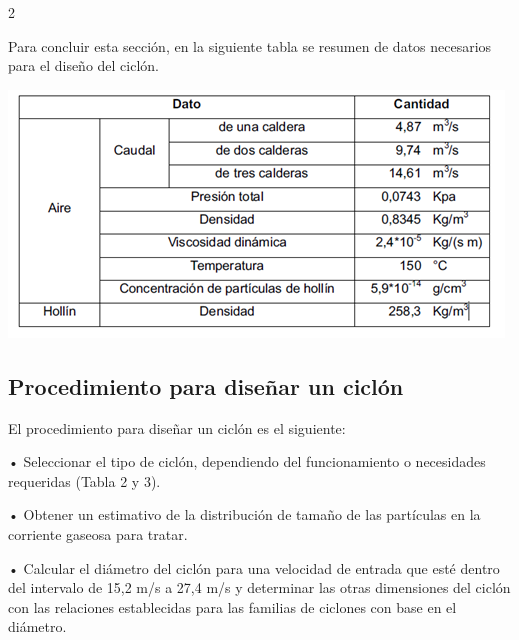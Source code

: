 \documentclass[12pt,spanish,Letterpaper,openany]{book}
\begin{document}
\begin {multicols}{2}
\begin {flushleft}
\begin{minipage}[c]{\columnwidth}
\end{minipage}

\end {flushleft}

Para concluir esta sección, en la siguiente tabla se resumen de datos necesarios para el diseño del ciclón.

\begin {flushleft}
\noindent\begin{minipage}[c]{\columnwidth}

\centering

\includegraphics[width=1\linewidth]{images/image09_wvaliente}

\end{minipage}

\end {flushleft}

\hypertarget{procedimiento-para-disenar-un-ciclon}{%
\subsection{Procedimiento para diseñar un ciclón}\label{procedimiento-para-disenar-un-ciclon}}

El procedimiento para diseñar un ciclón es el siguiente:

• Seleccionar el tipo de ciclón, dependiendo del funcionamiento o necesidades requeridas (Tabla 2 y 3).

• Obtener un estimativo de la distribución de tamaño de las partículas en la corriente gaseosa para tratar.

• Calcular el diámetro del ciclón para una velocidad de entrada que esté dentro del intervalo de 15,2 m/s a 27,4 m/s y determinar las otras dimensiones del ciclón con las relaciones establecidas para las familias de ciclones con base en el diámetro.


\end{multicols}
\end{document}
